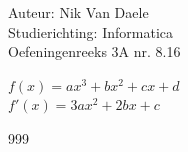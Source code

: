 \documentclass[a4paper]{article}
\begin{document}
  
\noindent \large Auteur: Nik Van Daele \\
\noindent \large Studierichting: Informatica\\
\noindent \large Oefeningenreeks 3A nr. 8.16\\

\medskip

\normalsize

$f(x) = ax^3 + bx^2 + cx + d$\\

$f'(x) = 3ax^2 + 2bx + c$

\begin{thebibliography}{999}
\end{thebibliography}
\end{document}
